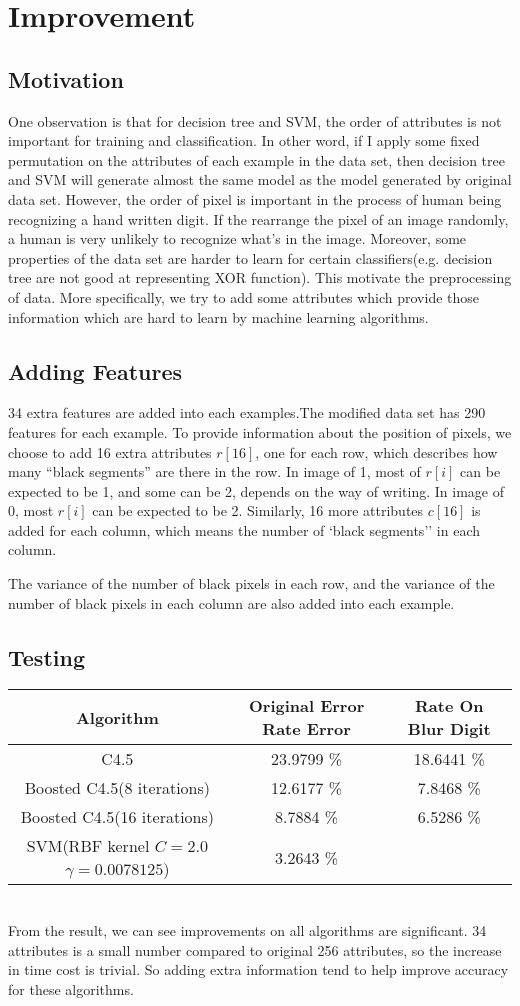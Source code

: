 \documentclass[a4paper,11pt]{article}
\begin{document}
\section{Improvement}
\subsection{Motivation}
One observation is that for decision tree and SVM, the order of attributes is not important for training and classification. In other word, if I apply some fixed permutation on the attributes of each example in the data set, then decision tree and SVM will generate almost the same model as the model generated by original data set.
However, the order of pixel is important in the process of human being recognizing a hand written digit. If the rearrange the pixel of an image randomly, a human is very unlikely to recognize what's in the image.
Moreover, some properties of the data set are harder to learn for certain classifiers(e.g. decision tree are not good at representing XOR function).
This motivate the preprocessing of data. More specifically, we try to add some attributes which provide those information which are hard to learn by machine learning algorithms.
\subsection{Adding Features}
34 extra features are added into each examples.The modified data set has 290 features for each example.
To provide information about the position of pixels, we choose to add 16 extra attributes $r[16]$, one for each row, which describes how many ``black segments'' are there in the row. In image of 1, most of $r[i]$ can be expected to be 1, and some can be 2, depends on the way of writing. In image of 0, most $r[i]$ can be expected to be 2.
Similarly, 16 more attributes $c[16]$ is added for each column, which means the number of `black segments'' in each column.

The variance of the number of black pixels in each row, and the variance of the number of black pixels in each column are also added into each example.
\subsection{Testing}
\vspace{0.5cm}
\begin{tabular}{c c c}
Algorithm		&	Original Error Rate	Error &Rate On Blur Digit\\
\hline \hline
C4.5		&		23.9799 \%		&18.6441 \%\\
Boosted C4.5(8 iterations)	&12.6177 \%		& 7.8468 \%\\
Boosted C4.5(16 iterations)	&8.7884 \%		& 6.5286 \%\\
SVM(RBF kernel $C=2.0$ $\gamma=0.0078125$)	& 3.2643 \%\\
\end{tabular}
\vspace{0.5cm}\\
From the result, we can see improvements on all algorithms are significant. 34 attributes is a small number compared to original 256 attributes, so the increase in time cost is trivial. So adding extra information tend to help improve accuracy for these algorithms.
\end{document}
